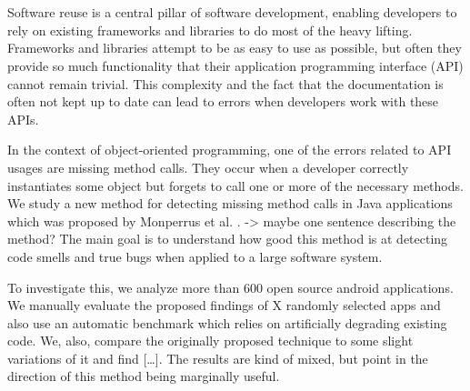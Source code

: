 \chapter{\abstractname}


Software reuse is a central pillar of software development, enabling developers to rely on existing frameworks and libraries to do most of the heavy lifting.
Frameworks and libraries attempt to be as easy to use as possible, but often they provide so much functionality that their application programming interface (API) cannot remain trivial.
This complexity and the fact that the documentation is often not kept up to date can lead to errors when developers work with these APIs.

In the context of object-oriented programming, one of the errors related to API usages are missing method calls.
They occur when a developer correctly instantiates some object but forgets to call one or more of the necessary methods.
We study a new method for detecting missing method calls in Java applications which was proposed by Monperrus et al. \cite{monperrus2010detecting}.
-> maybe one sentence describing the method?
The main goal is to understand how good this method is at detecting code smells and true bugs when applied to a large software system.

To investigate this, we analyze more than 600 open source android applications.
We manually evaluate the proposed findings of X randomly selected apps and also use an automatic benchmark which relies on artificially degrading existing code.
We, also, compare the originally proposed technique to some slight variations of it and find [\ldots].
The results are kind of mixed, but point in the direction of this method being marginally useful.
